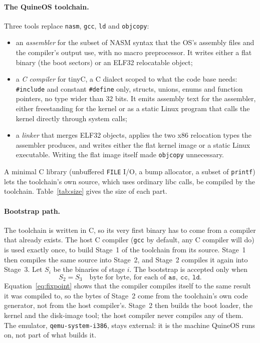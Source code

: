 \documentclass{article}
\newcommand{\sysname}{QuineOS}
\begin{document}
\paragraph{The \sysname{} toolchain.} Three tools replace \texttt{nasm}, \texttt{gcc},
\texttt{ld} and \texttt{objcopy}:
\begin{itemize}
  \item an \emph{assembler} for the subset of NASM syntax that the OS's assembly files
        and the compiler's output use, with no macro preprocessor. It writes either a
        flat binary (the boot sectors) or an ELF32 relocatable object;
  \item a \emph{C compiler} for tinyC, a C dialect scoped to what the code base needs:
        \texttt{\#include} and constant \texttt{\#define} only, structs, unions, enums
        and function pointers, no type wider than 32 bits. It emits assembly text for the
        assembler, either freestanding for the kernel or as a static Linux program that
        calls the kernel directly through system calls;
  \item a \emph{linker} that merges ELF32 objects, applies the two x86 relocation types
        the assembler produces, and writes either the flat kernel image or a static
        Linux executable. Writing the flat image itself made \texttt{objcopy}
        unnecessary.
\end{itemize}
A minimal C library (unbuffered \texttt{FILE} I/O, a bump allocator, a subset of
\texttt{printf}) lets the toolchain's own source, which uses ordinary libc calls, be
compiled by the toolchain. Table~\ref{tab:size} gives the size of each part.

\paragraph{Bootstrap path.} The toolchain is written in C, so its very first binary has
to come from a compiler that already exists. The host C compiler (\texttt{gcc} by
default, any C compiler will do) is used exactly once, to build Stage~1 of the
toolchain from its source. Stage~1 then compiles the same source into Stage~2, and
Stage~2 compiles it again into Stage~3. Let $S_i$ be the binaries of stage $i$. The
bootstrap is accepted only when
\begin{equation}\label{eq:fixpoint}
  S_2 = S_3 \quad \text{byte for byte, for each of } \texttt{as},\ \texttt{cc},\ \texttt{ld}.
\end{equation}
Equation~\eqref{eq:fixpoint} shows that the compiler compiles itself to the same result
it was compiled to, so the bytes of Stage~2 come from the toolchain's own code
generator, not from the host compiler's. Stage~2 then
builds the boot loader, the kernel and the disk-image tool; the host compiler never
compiles any of them. The emulator, \texttt{qemu-system-i386}, stays external: it is the
machine \sysname{} runs on, not part of what builds it.
\end{document}
